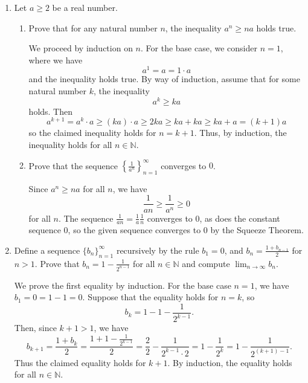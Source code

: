 \documentclass[12pt]{amsart}
\newcommand{\N}{\mathbb{N}}
\numberwithin{equation}{section}
\theoremstyle{plain} %
\theoremstyle{definition}
\theoremstyle{remark}
\begin{document}
\begin{enumerate}


\item Let $a \geq 2$ be a real number. 

\begin{enumerate}
\item Prove that for any natural number $n$, the inequality $a^n \geq na$ holds true.

\begin{framed}
We proceed by induction on $n$. For the base case, we consider $n=1$, where we have
\[ a^1 = a = 1 \cdot a\]
and the inequality holds true. By way of induction, assume that for some natural number $k$, the inequality
\[ a^k \geq k a\] holds. Then 
\[ a^{k+1} = a^k \cdot a \geq (ka) \cdot a \geq 2ka \geq ka + ka \geq ka + a = (k+1) a\]
so the claimed inequality holds for $n=k+1$. Thus, by induction, the inequality holds for all $n\in \N$.
\end{framed}

\item Prove that the sequence  $\left\{ \frac{1}{a^n} \right\}_{n=1}^\infty$ converges to $0$. 

\begin{framed}
Since $a^n \geq na$ for all $n$, we have
\[ \frac{1}{an} \geq \frac{1}{a^n} \geq 0\]
for all $n$. The sequence $\frac{1}{an} = \frac{1}{a} \frac{1}{n}$ converges to $0$, as does the constant sequence $0$, so the given sequence converges to $0$ by the Squeeze Theorem.
\end{framed}
\end{enumerate}



\item Define a sequence $\{ b_n\}_{n=1}^\infty$ recursively by the rule $b_1=0$, and $\displaystyle b_{n} = \frac{1+ b_{n-1}}{2}$ for $n>1$. Prove that $\displaystyle b_n = 1 - \frac{1}{2^{n-1}}$ for all $n\in \N$ and compute $\displaystyle\lim_{n\to \infty} b_n$.

\begin{framed}
We prove the first equality by induction. For the base case $n=1$, we have $b_1 = 0 = 1-1 = 0$. Suppose that the equality holds for $n=k$, so 
\[ b_k = 1 - 1 - \frac{1}{2^{k-1}}.\]
Then, since $k+1>1$, we have 
\[ b_{k+1} =  \frac{1 + b_k}{2} = \frac{1 + 1 - \frac{1}{2^{k-1}}}{2} = \frac{2}{2} - \frac{1}{2^{k-1} \cdot 2} = 1 - \frac{1}{2^k} = 1 - \frac{1}{2^{(k+1)-1}}.\]
Thus the claimed equality holds for $k+1$. By induction, the equality holds for all $n\in \N$.


\end{framed}
\end{enumerate}
\end{document}

